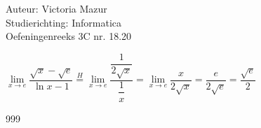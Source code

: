 \documentclass[a4paper]{article}
\begin{document}
  
\noindent \large Auteur: Victoria Mazur \\
\noindent \large Studierichting: Informatica\\
\noindent \large Oefeningenreeks 3C nr. 18.20\\

\medskip

\normalsize


$\lim\limits_{x \rightarrow e} \dfrac{\sqrt{x} - \sqrt{e}}{\ln x - 1} \overset{H}{=} \lim\limits_{x \rightarrow e} \dfrac{\dfrac{1}{2\sqrt{x}}}{\dfrac{1}{x}} = \lim\limits_{x \rightarrow e} \dfrac{x}{2\sqrt{x}} = \dfrac{e}{2\sqrt{e}} = \dfrac{\sqrt{e}}{2}$ \\

\begin{thebibliography}{999}
\end{thebibliography}
\end{document}
